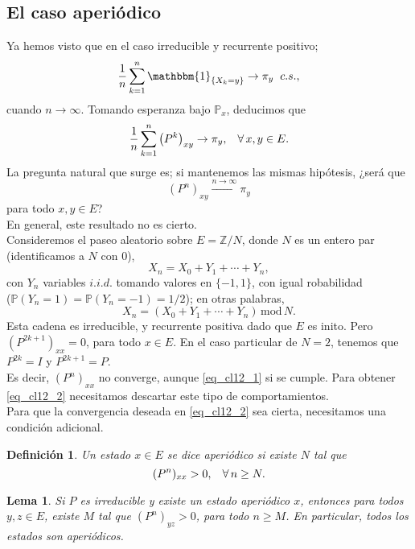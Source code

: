 \documentclass[a4paper]{article}
\newcommand{\prob}{\mathbb{P}}
\newtheorem{definicion}{Definición}
\newtheorem{lem}{Lema}
\numberwithin{equation}{subsection}
\def\Z{\mathbb Z}
\begin{document}
\subsection{El caso aperiódico}
Ya hemos visto que en el caso irreducible y recurrente positivo;
\[\frac{1}{n}\sum_{k=1}^n\mathbbm{1}_{\{X_k = y\}}\rightarrow \pi_y\hspace{0.2cm}c.s.,\]
cuando $n\rightarrow \infty$. Tomando esperanza bajo $\prob_x$, deducimos que
\begin{equation}
\frac{1}{n}\sum_{k=1}^n\left(P^k\right)_{xy}\rightarrow \pi_y,\hspace{0.3cm}\forall\,x,y\in E.
\label{eq_cl12_1}
\end{equation}
La pregunta natural que surge es; si mantenemos las mismas hipótesis, ¿será que
\begin{equation}
    (P^n)_{xy}\xrightarrow{n \rightarrow \infty}\pi_y
    \label{eq_cl12_2}
\end{equation}
para todo $x,y\in E$?\\ \newline
En general, este resultado no es cierto.\\ 

Consideremos el paseo aleatorio sobre $E = \Z/N$, donde $N$ es un entero par (identificamos a $N$ con 0),
\[X_n = X_0 + Y_1 + \cdots + Y_n,\]
con $Y_n$ variables $i.i.d.$ tomando valores en $\{-1,1\}$, con igual robabilidad \\($\prob(Y_n = 1) = \prob(Y_n=-1) = 1/2$); en otras palabras,
\[X_n = (X_0 + Y_1 + \cdots + Y_n)\,\text{mod}\,N.\]
Esta cadena es irreducible, y recurrente positiva dado que $E$ es inito. Pero $(P^{2k+1})_{xx}=0$, para todo $x\in E$. En el caso particular de $N=2$, tenemos que $P^{2k} = I$ y $P^{2k+1} = P$.\\ Es decir, $(P^n)_{xx}$ no converge, aunque \ref{eq_cl12_1} si se cumple. Para obtener \ref{eq_cl12_2} necesitamos descartar este tipo de comportamientos.\\ \newline
Para que la convergencia deseada en \ref{eq_cl12_2} sea cierta, necesitamos una condición adicional.
\begin{definicion}
Un estado $x\in E$ se dice aperiódico si existe $N$ tal que 
\[(P^n)_{xx}>0,\hspace{0.3cm}\forall\,n\geq N.\]
\end{definicion}
\begin{lem}
Si $P$ es irreducible y existe un estado aperiódico $x$, entonces para todos $y,z \in E$, existe $M$ tal que $(P^n)_{yz} >0$, para todo $n\geq M$. En particular, todos los estados son aperiódicos.
\end{lem}
\end{document}
